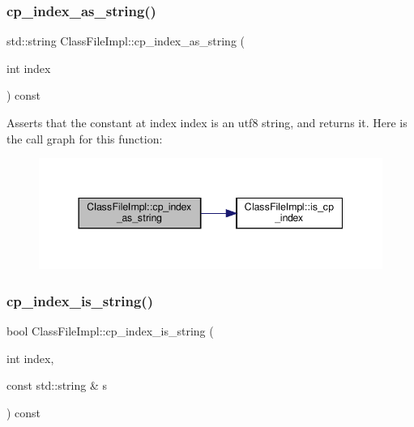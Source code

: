 \subsubsection{\texorpdfstring{cp\+\_\+index\+\_\+as\+\_\+string()}{cp\_index\_as\_string()}}
{\footnotesize\ttfamily std\+::string Class\+File\+Impl\+::cp\+\_\+index\+\_\+as\+\_\+string (\begin{DoxyParamCaption}\item[{int}]{index }\end{DoxyParamCaption}) const}

Asserts that the constant at index {\ttfamily index} is an utf8 string, and returns it. Here is the call graph for this function\+:\nopagebreak
\begin{figure}[H]
\begin{center}
\leavevmode
\includegraphics[width=344pt]{classClassFileImpl_abf8923075c93d6d5bd1755a7b3ced362_cgraph}
\end{center}
\end{figure}
\mbox{\label{classClassFileImpl_ab84cd50d25d163274a299ba682f57610}} 
\subsubsection{\texorpdfstring{cp\+\_\+index\+\_\+is\+\_\+string()}{cp\_index\_is\_string()}}
{\footnotesize\ttfamily bool Class\+File\+Impl\+::cp\+\_\+index\+\_\+is\+\_\+string (\begin{DoxyParamCaption}\item[{int}]{index,  }\item[{const std\+::string \&}]{s }\end{DoxyParamCaption}) const}


